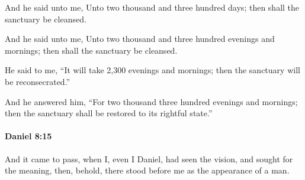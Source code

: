 			And he said unto me, Unto two thousand and three hundred days; then shall the sanctuary be cleansed.

			\begin{versebox}
					\item[BHS] 
					\item[LXX] 
					\item[ASV] And he said unto me, Unto two thousand and three hundred evenings and mornings; then shall the sanctuary be cleansed.
					\item[NIV] He said to me, “It will take 2,300 evenings and mornings; then the sanctuary will be reconsecrated.”
					\item[NRSV] And he answered him, “For two thousand three hundred evenings and mornings; then the sanctuary shall be restored to its rightful state.”
			\end{versebox}

		\paragraph{Daniel 8:15} %
			\label{DANIEL-8-15}

			And it came to pass, when I, even I Daniel, had seen the vision, and sought for the meaning, then, behold, there stood before me as the appearance of a man.

